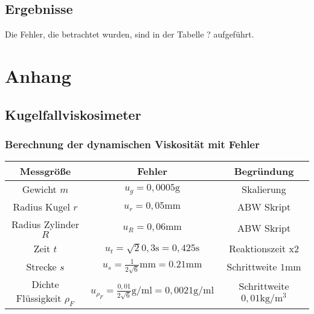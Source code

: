 \documentclass[11pt, a4paper]{article}
\begin{document}
    \subsection{Ergebnisse}

    Die Fehler, die betrachtet wurden, sind in der Tabelle ? aufgeführt.



    \section{Anhang}
    \subsection{Kugelfallviskosimeter}

    \subsubsection{Berechnung der dynamischen Viskosität mit Fehler}
    
    \begin{table}
       \begin{adjustwidth}{-5cm}{-5cm}
            \centering
            \begin{tabular}{c c c}
                Messgröße & Fehler & Begründung \\ \hline
                
                Gewicht $m$ & $u_g = 0,0005 \si{\gram}$ & Skalierung \\
                Radius Kugel $r$ & $u_r = 0,05 \si{\milli\meter}$ & ABW Skript \cite[Tabelle 6]{ABW} \\
                Radius Zylinder $R$ & $u_R = 0,06 \si{\milli\meter}$ & ABW Skript \cite[Tabelle 6]{ABW} \\
                Zeit $t$ & $u_t = \sqrt{2} 0,3\si{\second} = 0,425 \si{\second}$ & Reaktionszeit x2\\
                Strecke $s$ & $u_s = \frac{1}{2\sqrt{6}} \si{\milli\metre} = 0.21 \si{\milli\metre}$ & Schrittweite $1 \si{\milli\metre}$ \\
                Dichte Flüssigkeit $\rho_F$ & $u_{\rho_F} = \frac{0,01}{2\sqrt{6}} \si{\gram \per \milli\litre} = 0,0021  \si{\gram\per\milli\litre}$ & Schrittweite $0,01 \si{\kilogram\per\cubic\metre}$ \\

            \end{tabular}
        \end{adjustwidth}
    \end{table}
    
\end{document}
